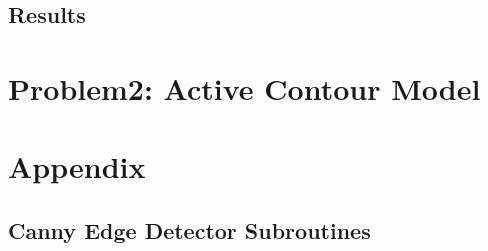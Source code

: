 \documentclass[journal,9pt,onecolumn,draftclsnofoot]{ieeeconf} %
\begin{document}
\subsection*{Results}



\section*{Problem2: Active Contour Model}


\section*{Appendix }
\subsection*{Canny Edge Detector Subroutines}\label{appendix:canny-details}


\end{document}
